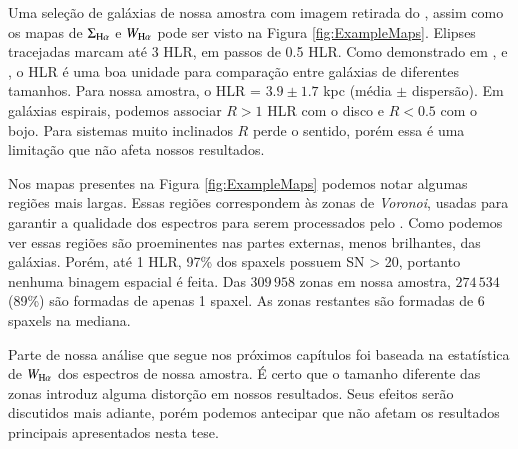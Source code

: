 Uma seleção de galáxias de nossa amostra com imagem retirada do \SDSS, assim como os mapas de $\Sigma_{\Ha}$ e $W_{\Ha}$ pode ser visto na Figura \ref{fig:ExampleMaps}. Elipses tracejadas marcam até 3 HLR, em passos de 0.5 HLR. Como demonstrado em \citet{Perez.etal.2013}, \citet{Sanchez.etal.2014} e \citet{GonzalezDelgado.etal.2016a}, o HLR é uma boa unidade para comparação entre galáxias de diferentes tamanhos. Para nossa amostra, o HLR = $3.9 \pm 1.7$ kpc (média $\pm$ dispersão). Em galáxias espirais, podemos associar $R > 1$ HLR com o disco e $R < 0.5$ com o bojo. Para sistemas muito inclinados $R$ perde o sentido, porém essa é uma limitação que não afeta nossos resultados.

Nos mapas presentes na Figura \ref{fig:ExampleMaps} podemos notar algumas regiões mais largas. Essas regiões correspondem às zonas de {\em Voronoi}, usadas para garantir a qualidade dos espectros para serem processados pelo \starlight. Como podemos ver essas regiões são proeminentes nas partes externas, menos brilhantes, das galáxias. Porém, até 1 HLR, 97\% dos spaxels possuem SN > 20, portanto nenhuma binagem espacial é feita. Das $309\,958$ zonas em nossa amostra, $274\,534$ (89\%) são formadas de apenas 1 spaxel. As zonas restantes são formadas de 6 spaxels na mediana.

Parte de nossa análise que segue nos próximos capítulos foi baseada na estatística de $W_{\Ha}$ dos espectros de nossa amostra. É certo que o tamanho diferente das zonas introduz alguma distorção em nossos resultados. Seus efeitos serão discutidos mais adiante, porém podemos antecipar que não afetam os resultados principais apresentados nesta tese.



